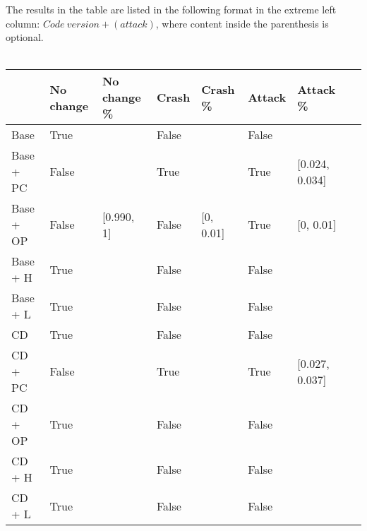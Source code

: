 The results in the table are listed in the following format in the extreme left column: $Code\:version + (attack)$, where content inside the parenthesis is optional.\\\\

\begin{table}
    \begin{tabular}{l|l|l|l|l|l|l|l}
    ~         & No change & No change \% & Crash & Crash \% & Attack & Attack \% \\ \hline
    Base      & True &\relax[0.990, 1] & False & \relax[0, 0.01] & False & \relax[0, 0.01] ~                                                                                    & ~ \\
    Base + PC & False & \relax[0.854, 0.864] & True & \relax[0.108, 0.118] & True & [0.024, 0.034]                                                                                   & ~ \\
    Base + OP & False & [0.990, 1] & False & [0, 0.01] & True & [0, 0.01]                                                                                   & ~ \\
    Base + H  & True &\relax[0.990, 1] & False & \relax[0, 0.01] & False & \relax[0, 0.01]                                                                                    & ~ \\
    Base + L  & True &\relax[0.990, 1] & False & \relax[0, 0.01] & False & \relax[0, 0.01]                                                                                    & ~ \\
    CD        & True &\relax[0.990, 1] & False & \relax[0, 0.01] & False & \relax[0, 0.01]                                                                                    & ~ \\
    CD + PC   & False & \relax[0.851, 0.861] & True & \relax[0.108, 0.118] & True & [0.027, 0.037]                                                                                & ~ \\
    CD + OP   & True &\relax[0.990, 1] & False & \relax[0, 0.01] & False & \relax[0, 0.01]                                                                                   & ~ \\
    CD + H    & True &\relax[0.990, 1] & False & \relax[0, 0.01] & False & \relax[0, 0.01]                                                                                    & ~ \\
    CD + L    & True &\relax[0.990, 1] & False & \relax[0, 0.01] & False & \relax[0, 0.01]                                                                                    & ~ \\

\end{tabular}
\end{table}
